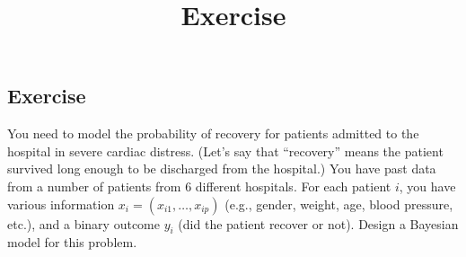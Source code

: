 \documentclass[12pt]{article}
\title{Exercise}
\author{}
\date{}
\begin{document}
\maketitle


\subsection*{Exercise}
You need to model the probability of recovery for patients admitted to the hospital in severe cardiac distress. (Let's say that ``recovery'' means the patient survived long enough to be discharged from the hospital.) You have past data from a number of patients from 6 different hospitals.
For each patient $i$, you have various information $x_i = (x_{i 1},\ldots,x_{i p})$ (e.g., gender, weight, age, blood pressure, etc.), and a binary outcome $y_i$ (did the patient recover or not).
Design a Bayesian model for this problem.
\end{document}
